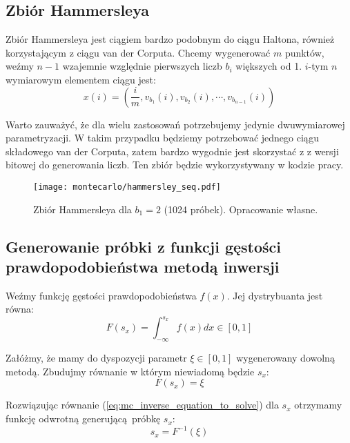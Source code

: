 \documentclass[../main.tex]{subfiles}
\begin{document}
\subsection{Zbiór Hammersleya}

Zbiór Hammersleya jest ciągiem bardzo podobnym do ciągu Haltona, również korzystającym z ciągu van der Corputa. Chcemy wygenerować $m$ punktów, weźmy $n-1$ wzajemnie względnie pierwszych liczb $b_i$ większych od 1. $i$-tym $n$ wymiarowym elementem ciągu jest:
\begin{equation}
  x(i) = \left(
    \frac{i}{m}, v_{b_1}(i), v_{b_2}(i), \cdots, v_{b_{n-1}}(i)
  \right)
\end{equation}

Warto zauważyć, że dla wielu zastosowań potrzebujemy jedynie dwuwymiarowej parametryzacji. W takim przypadku będziemy potrzebować jednego ciągu składowego van der Corputa, zatem bardzo wygodnie jest skorzystać z  z wersji bitowej do generowania liczb. Ten zbiór będzie wykorzystywany w kodzie pracy.

\begin{figure}[h]
  \centering
  \texttt{[image: montecarlo/hammersley\_seq.pdf]}
  \caption{Zbiór Hammersleya dla $b_1=2$ (1024 próbek). Opracowanie własne.}
  \label{fig:HammersleySamples}
\end{figure}

\subsection{Generowanie próbki z funkcji gęstości prawdopodobieństwa metodą inwersji}
\label{section:pdfsampling}

Weźmy funkcję gęstości prawdopodobieństwa $f(x)$. Jej dystrybuanta jest równa:
\begin{equation}
F(s_x) = \int_{-\infty}^{s_{x}} f(x) dx \in [0,1] 
\end{equation}

Załóżmy, że mamy do dyspozycji parametr $\xi \in [0,1]$ wygenerowany dowolną metodą. Zbudujmy równanie w którym niewiadomą będzie $s_x$:
\begin{equation}
F(s_x) = \xi
\label{eq:mc_inverse_equation_to_solve}
\end{equation}

Rozwiązując równanie (\ref{eq:mc_inverse_equation_to_solve}) dla $s_x$ otrzymamy funkcję odwrotną generującą próbkę $s_x$:
\begin{equation}
s_x = F^{-1}(\xi)
\end{equation}
\end{document}
